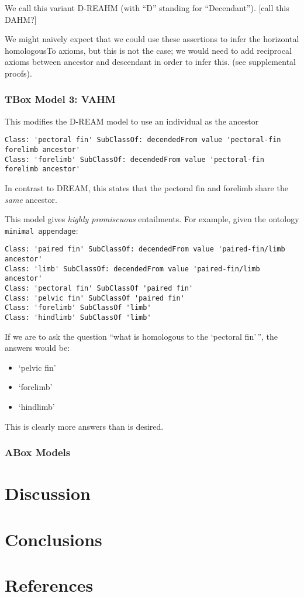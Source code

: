 We call this variant D-REAHM (with ``D'' standing for ``Decendant'').
{[}call this DAHM?{]}

We might naively expect that we could use these assertions to infer the
horizontal homologousTo axioms, but this is not the case; we would need
to add reciprocal axioms between ancestor and descendant in order to
infer this. (see supplemental proofs).

\subsubsection{TBox Model 3: VAHM}\label{tbox-model-3-vahm}

This modifies the D-REAM model to use an individual as the ancestor

\begin{verbatim}
Class: 'pectoral fin' SubClassOf: decendedFrom value 'pectoral-fin forelimb ancestor'
Class: 'forelimb' SubClassOf: decendedFrom value 'pectoral-fin forelimb ancestor'
\end{verbatim}

In contrast to DREAM, this states that the pectoral fin and forelimb
share the \emph{same} ancestor.

This model gives \emph{highly promiscuous} entailments. For example,
given the ontology \texttt{minimal appendage}:

\begin{verbatim}
Class: 'paired fin' SubClassOf: decendedFrom value 'paired-fin/limb ancestor'
Class: 'limb' SubClassOf: decendedFrom value 'paired-fin/limb ancestor'
Class: 'pectoral fin' SubClassOf 'paired fin'
Class: 'pelvic fin' SubClassOf 'paired fin'
Class: 'forelimb' SubClassOf 'limb'
Class: 'hindlimb' SubClassOf 'limb'
\end{verbatim}

If we are to ask the question ``what is homologous to the `pectoral
fin'\,'', the answers would be:

\begin{itemize}
\itemsep1pt\parskip0pt
\item
  `pelvic fin'
\item
  `forelimb'
\item
  `hindlimb'
\end{itemize}

This is clearly more answers than is desired.

\subsubsection{ABox Models}\label{abox-models}

\subsection{}\label{section}

\section{Discussion}\label{discussion}

\section{Conclusions}\label{conclusions}

\section{References}\label{references}
